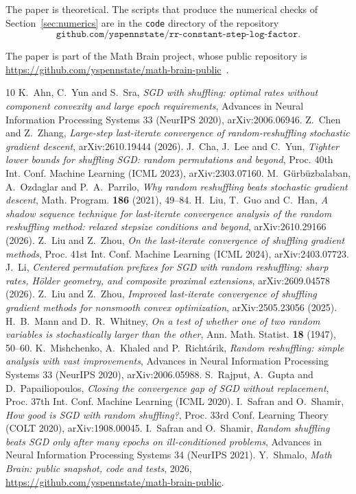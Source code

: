 \documentclass[11pt]{amsart}
\theoremstyle{remark}\newtheorem{remark}[theorem]{Remark}
\begin{document}
The paper is theoretical. The scripts that produce the numerical checks of Section~\ref{sec:numerics} are in the
\texttt{code} directory of the repository
\[
\texttt{github.com/yspennstate/rr-constant-step-log-factor}.
\]

The paper is part of the Math Brain project, whose public repository is \url{https://github.com/yspennstate/math-brain-public}~\cite{MathBrainRepo}.

\begin{thebibliography}{10}
 K.~Ahn, C.~Yun and S.~Sra, \emph{SGD with shuffling: optimal rates without component convexity and large
epoch requirements}, Advances in Neural Information Processing Systems 33 (NeurIPS 2020), arXiv:2006.06946.
 Z.~Chen and Z.~Zhang, \emph{Large-step last-iterate convergence of random-reshuffling stochastic
gradient descent}, arXiv:2610.19444 (2026).
 J.~Cha, J.~Lee and C.~Yun, \emph{Tighter lower bounds for shuffling SGD: random permutations and beyond},
Proc. 40th Int. Conf. Machine Learning (ICML 2023), arXiv:2303.07160.
 M.~G\"urb\"uzbalaban, A.~Ozdaglar and P.~A.~Parrilo, \emph{Why random reshuffling beats stochastic
gradient descent}, Math. Program. \textbf{186} (2021), 49--84.
 H.~Liu, T.~Guo and C.~Han, \emph{A shadow sequence technique for last-iterate convergence analysis of the
random reshuffling method: relaxed stepsize conditions and beyond}, arXiv:2610.29166 (2026).
 Z.~Liu and Z.~Zhou, \emph{On the last-iterate convergence of shuffling gradient methods}, Proc. 41st Int.
Conf. Machine Learning (ICML 2024), arXiv:2403.07723.
 J.~Li, \emph{Centered permutation prefixes for SGD with random reshuffling: sharp rates, H\"older geometry,
and composite proximal extensions}, arXiv:2609.04578 (2026).
 Z.~Liu and Z.~Zhou, \emph{Improved last-iterate convergence of shuffling gradient methods for nonsmooth
convex optimization}, arXiv:2505.23056 (2025).
 H.~B.~Mann and D.~R.~Whitney, \emph{On a test of whether one of two random variables is stochastically
larger than the other}, Ann. Math. Statist. \textbf{18} (1947), 50--60.
 K.~Mishchenko, A.~Khaled and P.~Richt\'arik, \emph{Random reshuffling: simple analysis with vast
improvements}, Advances in Neural Information Processing Systems 33 (NeurIPS 2020), arXiv:2006.05988.
 S.~Rajput, A.~Gupta and D.~Papailiopoulos, \emph{Closing the convergence gap of SGD without replacement},
Proc. 37th Int. Conf. Machine Learning (ICML 2020).
 I.~Safran and O.~Shamir, \emph{How good is SGD with random shuffling?}, Proc. 33rd Conf. Learning Theory
(COLT 2020), arXiv:1908.00045.
 I.~Safran and O.~Shamir, \emph{Random shuffling beats SGD only after many epochs on ill-conditioned
problems}, Advances in Neural Information Processing Systems 34 (NeurIPS 2021).
 Y.~Shmalo, \emph{Math Brain: public snapshot, code and tests}, 2026, \url{https://github.com/yspennstate/math-brain-public}.


\end{thebibliography}
\end{document}

